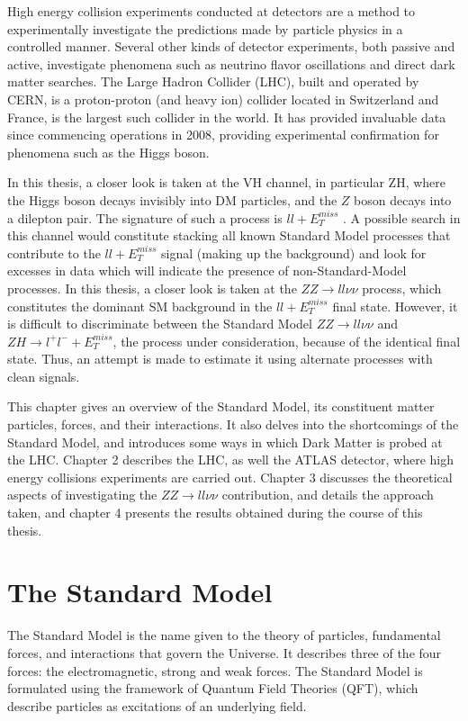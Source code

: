 \documentclass[11pt,a4paper,openright,twoside]{report}
\newcommand{\ZZ}{$ZZ\to ll\nu\nu$ }
\newcommand{\llM}{$ll+E_T^{miss}$ }
\begin{document}
High energy collision experiments conducted at detectors are a method to experimentally investigate the predictions made by particle physics in a controlled manner. Several other kinds of detector experiments, both passive and active, investigate phenomena such as neutrino flavor oscillations and direct dark matter searches. The Large Hadron Collider (LHC), built and operated by CERN, is a proton-proton (and heavy ion) collider located in Switzerland and France, is the largest such collider in the world. It has provided invaluable data since commencing operations in 2008, providing experimental confirmation for phenomena such as the Higgs boson.

In this thesis, a closer look is taken at the VH channel, in particular ZH, where the Higgs boson decays invisibly into DM particles, and the $Z$ boson decays into a dilepton pair. The signature of such a process is \llM. A possible search in this channel would constitute stacking all known Standard Model processes that contribute to the \llM signal (making up the background) and look for excesses in data which will indicate the presence of non-Standard-Model processes. In this thesis, a closer look is taken at the \ZZ process, which constitutes the dominant SM background in the \llM final state. However, it is difficult to discriminate between the Standard Model \ZZ and $ZH\to l^+l^-+E_T^{miss}$, the process under consideration, because of the identical final state. Thus, an attempt is made to estimate it using alternate processes with clean signals. 

This chapter gives an overview of the Standard Model, its constituent matter particles, forces, and their interactions. It also delves into the shortcomings of the Standard Model, and introduces some ways in which Dark Matter is probed at the LHC. Chapter 2 describes the LHC, as well the ATLAS detector, where high energy collisions experiments are carried out. Chapter 3 discusses the theoretical aspects of investigating the \ZZ contribution, and details the approach taken, and chapter 4 presents the results obtained during the course of this thesis.

\section{The Standard Model}
The Standard Model is the name given to the theory of particles, fundamental forces, and interactions that govern the Universe. It describes three of the four forces: the electromagnetic, strong and weak forces. The Standard Model is formulated using the framework of Quantum Field Theories (QFT), which describe particles as excitations of an underlying field.
\end{document}
